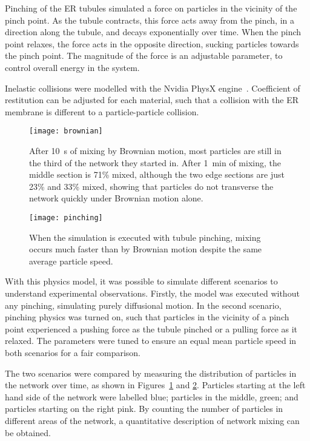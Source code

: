 Pinching of the ER tubules simulated a force on particles in the vicinity of the pinch point. 
As the tubule contracts, this force acts away from the pinch, in a direction along the tubule, and decays exponentially over time. 
When the pinch point relaxes, the force acts in the opposite direction, sucking particles towards the pinch point. 
The magnitude of the force is an adjustable parameter, to control overall energy in the system. 

Inelastic collisions were modelled with the Nvidia PhysX engine~\cite{nvidia2008physx}. 
Coefficient of restitution can be adjusted for each material, such that a collision with the ER membrane is different to a particle-particle collision. 

\begin{figure}[t!]
	\centering
	\texttt{[image: brownian]}
	\caption[ER simulation: After one minute of mixing by Brownian motion the simulated ER mixture is not homogeneous]{After \SI{10}{\second} of mixing by Brownian motion, most particles are still in the third of the network they started in. After \SI{1}{\minute} of mixing, the middle section is 71\% mixed, although the two edge sections are just 23\% and 33\% mixed, showing that particles do not transverse the network quickly under Brownian motion alone. }
	\label{fig:ER-simulation-brownian}
\end{figure}

\begin{figure}[t!]
	\centering
	\texttt{[image: pinching]}
	\caption[ER simulation: A homogeneous mixture is achieved after one minute in the ER simulation with pinching]{When the simulation is executed with tubule pinching, mixing occurs much faster than by Brownian motion despite the same average particle speed.}
	\label{fig:ER-simulation-pinching}
\end{figure}

With this physics model, it was possible to simulate different scenarios to understand experimental observations. 
Firstly, the model was executed without any pinching, simulating purely diffusional motion. 
In the second scenario, pinching physics was turned on, such that particles in the vicinity of a pinch point experienced a pushing force as the tubule pinched or a pulling force as it relaxed. 
The parameters were tuned to ensure an equal mean particle speed in both scenarios for a fair comparison. 

The two scenarios were compared by measuring the distribution of particles in the network over time, as shown in Figures~\ref{fig:ER-simulation-brownian} and \ref{fig:ER-simulation-pinching}. 
Particles starting at the left hand side of the network were labelled blue; particles in the middle, green; and particles starting on the right pink. 
By counting the number of particles in different areas of the network, a quantitative description of network mixing can be obtained. 

